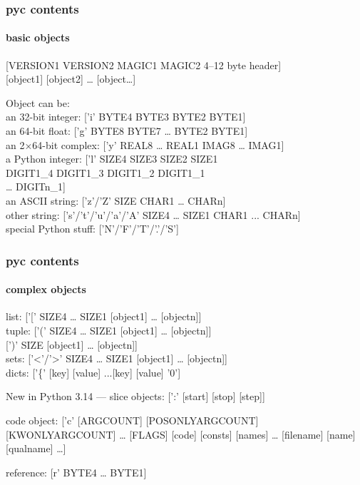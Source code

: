 \documentclass[]{beamer}
\begin{document}
\begin{frame}
  \frametitle{pyc contents}
  \framesubtitle{basic objects}

  \pause

  [VERSION1 VERSION2 MAGIC1 MAGIC2 4–12 byte header]\\
  {}[object1] [object2] … [object…]

  \vfill
  \pause

  Object can be:\\\pause
  an 32-bit integer: ['i' BYTE4 BYTE3 BYTE2 BYTE1]\\\pause
  an 64-bit float: ['g' BYTE8 BYTE7 … BYTE2 BYTE1]\\\pause
  an 2×64-bit complex: ['y' REAL8 … REAL1 IMAG8 … IMAG1]\\\pause
  a Python integer: ['l' SIZE4 SIZE3 SIZE2 SIZE1\\
    \phantom{x} \hfill DIGIT1\_4 DIGIT1\_3 DIGIT1\_2 DIGIT1\_1\phantom{]}\\
    \phantom{x} \hfill … DIGITn\_1] \\\pause
  an ASCII string: ['z'/'Z' SIZE CHAR1 … CHARn]\\\pause
  other string: ['s'/'t'/'u'/'a'/'A' SIZE4 … SIZE1 CHAR1 ... CHARn]\\\pause
  special Python stuff: ['N'/'F'/'T'/'.'/'S']
\end{frame}

\begin{frame}
  \frametitle{pyc contents}
  \framesubtitle{complex objects}

  \pause

  list: ['[' SIZE4 … SIZE1 [object1] … [objectn]]\\\pause
  tuple: ['(' SIZE4 … SIZE1 [object1] … [objectn]]\\\pause
  \phantom{tuple:} [')' SIZE [object1] … [objectn]]\\\pause
  sets: ['<'/'>' SIZE4 … SIZE1 [object1] … [objectn]]\\\pause
  dicts: ['\{' [key] [value] ...[key] [value] '0']\\\pause

  New in Python 3.14 — slice objects: [':' [start] [stop] [step]]
  \\\pause

  code object: ['c' [ARGCOUNT] [POSONLYARGCOUNT] [KWONLYARGCOUNT] … [FLAGS] [code] [consts] [names] … [filename] [name] [qualname] …]
  \\\pause

  reference: [r' BYTE4 … BYTE1]
\end{frame}
\end{document}
